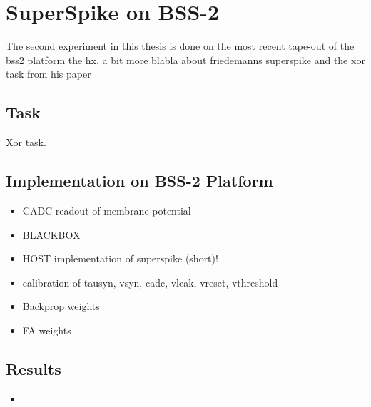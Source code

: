 \section{SuperSpike on BSS-2}

The second experiment in this thesis is done on the most recent tape-out of the \gls{bss2} platform the \gls{hx}. 
a bit more blabla about friedemanns superspike and the xor task from his paper 
 
\subsection{Task}
Xor task.


\subsection{Implementation on BSS-2 Platform}
\begin{itemize}
	\item CADC readout of membrane potential
	\item BLACKBOX
	\item HOST implementation of superspike (short)!
	\item calibration of tausyn, vsyn, cadc, vleak, vreset, vthreshold
	\item Backprop weights
	\item FA weights
\end{itemize}
	
\subsection{Results}
\begin{itemize}
	\item 
\end{itemize}